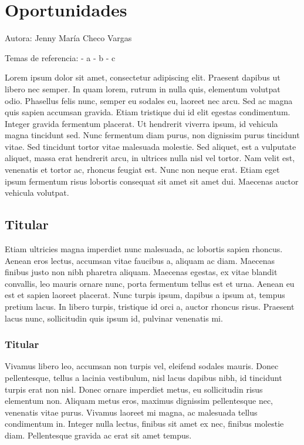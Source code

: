 \documentclass[
  letterpaper,
  DIV=11,
  numbers=noendperiod]{scrreprt}
\begin{document}

\hypertarget{oportunidades}{%
\chapter{Oportunidades}\label{oportunidades}}

Autora: Jenny María Checo Vargas

Temas de referencia: - a - b - c

Lorem ipsum dolor sit amet, consectetur adipiscing elit. Praesent
dapibus ut libero nec semper. In quam lorem, rutrum in nulla quis,
elementum volutpat odio. Phasellus felis nunc, semper eu sodales eu,
laoreet nec arcu. Sed ac magna quis sapien accumsan gravida. Etiam
tristique dui id elit egestas condimentum. Integer gravida fermentum
placerat. Ut hendrerit viverra ipsum, id vehicula magna tincidunt sed.
Nunc fermentum diam purus, non dignissim purus tincidunt vitae. Sed
tincidunt tortor vitae malesuada molestie. Sed aliquet, est a vulputate
aliquet, massa erat hendrerit arcu, in ultrices nulla nisl vel tortor.
Nam velit est, venenatis et tortor ac, rhoncus feugiat est. Nunc non
neque erat. Etiam eget ipsum fermentum risus lobortis consequat sit amet
sit amet dui. Maecenas auctor vehicula volutpat.

\hypertarget{titular-2}{%
\section{Titular}\label{titular-2}}

Etiam ultricies magna imperdiet nunc malesuada, ac lobortis sapien
rhoncus. Aenean eros lectus, accumsan vitae faucibus a, aliquam ac diam.
Maecenas finibus justo non nibh pharetra aliquam. Maecenas egestas, ex
vitae blandit convallis, leo mauris ornare nunc, porta fermentum tellus
est et urna. Aenean eu est et sapien laoreet placerat. Nunc turpis
ipsum, dapibus a ipsum at, tempus pretium lacus. In libero turpis,
tristique id orci a, auctor rhoncus risus. Praesent lacus nunc,
sollicitudin quis ipsum id, pulvinar venenatis mi.

\hypertarget{titular-3}{%
\subsection{Titular}\label{titular-3}}

Vivamus libero leo, accumsan non turpis vel, eleifend sodales mauris.
Donec pellentesque, tellus a lacinia vestibulum, nisl lacus dapibus
nibh, id tincidunt turpis erat non nisl. Donec ornare imperdiet metus,
eu sollicitudin risus elementum non. Aliquam metus eros, maximus
dignissim pellentesque nec, venenatis vitae purus. Vivamus laoreet mi
magna, ac malesuada tellus condimentum in. Integer nulla lectus, finibus
sit amet ex nec, finibus molestie diam. Pellentesque gravida ac erat sit
amet tempus.
\end{document}
